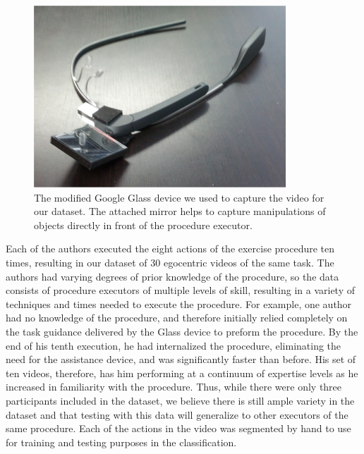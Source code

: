 \documentclass[10pt,twocolumn,letterpaper]{article}
\begin{document}
\begin{figure}[!b]
    \centering
    \includegraphics[width=\columnwidth]{fig/glass.png}
    \caption{The modified Google Glass device we used to capture the video for our dataset. The attached mirror helps to capture manipulations of objects directly in front of the procedure executor.}
    \label{fig:glass}
\end{figure}

Each of the authors executed the eight actions of the exercise procedure ten times, resulting in our dataset of 30 egocentric videos of the same task. The authors had varying degrees of prior knowledge of the procedure, so the data consists of procedure executors of multiple levels of skill, resulting in a variety of techniques and times needed to execute the procedure. For example, one author had no knowledge of the procedure, and therefore initially relied completely on the task guidance delivered by the Glass device to preform the procedure. By the end of his tenth execution, he had internalized the procedure, eliminating the need for the assistance device, and was significantly faster than before. His set of ten videos, therefore, has him performing at a continuum of expertise levels as he increased in familiarity with the procedure. Thus, while there were only three participants included in the dataset, we believe there is still ample variety in the dataset and that testing with this data will generalize to other executors of the same procedure. Each of the actions in the video was segmented by hand to use for training and testing purposes in the classification.
\end{document}

